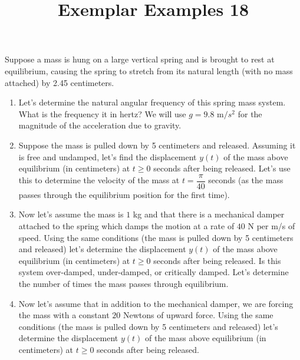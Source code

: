 \documentclass{ximera}
\begin{document}
\begin{abstract}
 \end{abstract}

    \title{Exemplar Examples 18}
    
    \maketitle


Suppose a mass is hung on a large vertical spring and is brought to rest at equilibrium, causing the spring to stretch from its natural length (with no mass attached) by 2.45 centimeters.

\begin{enumerate}

\item Let's determine the natural angular frequency of this spring mass system.  What is the frequency it in hertz?  We will use $g=9.8$ m$/s^2$ for the magnitude of the acceleration due to gravity.

\vfill




\item Suppose the mass is pulled down by 5 centimeters and released.  Assuming it is free and undamped, let's find the displacement $y(t)$ of the mass above equilibrium (in centimeters) at $t\geq 0$ seconds after being released.  Let's use this to determine the velocity of the mass at $t=\dfrac{\pi}{40}$ seconds (as the mass passes through the equilibrium position for the first time).

\vfill
\vfill



\newpage

\item Now let's assume the mass is $1$ kg and that there is a mechanical damper attached to the spring which damps the motion at a rate of $40$ N per m/s of speed.  Using the same conditions (the mass is pulled down by 5 centimeters and released) let's determine the displacement $y(t)$ of the mass above equilibrium (in centimeters) at $t\geq 0$ seconds after being released.  Is this system over-damped, under-damped, or critically damped.  Let's determine the number of times the mass passes through equilibrium.

\vfill

\item Now let's assume that in addition to the mechanical damper, we are forcing the mass with a constant $20$ Newtons of upward force.  Using the same conditions (the mass is pulled down by 5 centimeters and released) let's determine the displacement $y(t)$ of the mass above equilibrium (in centimeters) at $t\geq 0$ seconds after being released.

\vfill


\end{enumerate}
\end{document}
